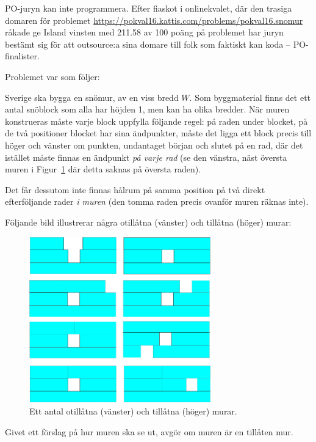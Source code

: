 PO-juryn kan inte programmera. Efter fiaskot i onlinekvalet, där den trasiga domaren för problemet \href{Snömur}{https://pokval16.kattis.com/problems/pokval16.snomur} råkade ge Island vinsten med 211.58 av 100 poäng på problemet har juryn bestämt sig för att outsource:a sina domare till folk som faktiskt kan koda -- PO-finalister.

Problemet var som följer:

Sverige ska bygga en snömur, av en viss bredd $W$.
Som byggmaterial finns det ett antal snöblock som alla har höjden 1, men kan ha olika bredder.
När muren konstrueras måste varje block uppfylla följande regel: på raden under blocket,
på de två positioner blocket har sina ändpunkter, måste det ligga ett block precis till höger och vänster om punkten,
undantaget början och slutet på en rad, där det istället måste finnas en ändpunkt \emph{på varje rad} (se den vänstra, näst översta muren i Figur~\ref{fig:sample} där detta saknas på översta raden).

Det får dessutom inte finnas hålrum på samma position på två direkt efterföljande rader \emph{i muren} (den tomma raden
precis ovanför muren räknas inte).

Följande bild illustrerar några otillåtna (vänster) och tillåtna (höger) murar:

\begin{figure}[h]
	\centering
	\includegraphics[width=0.7\textwidth]{mur.png}
	\caption{Ett antal otillåtna (vänster) och tillåtna (höger) murar.}
  \label{fig:sample}
\end{figure}

Givet ett förslag på hur muren ska se ut, avgör om muren är en tillåten mur.

